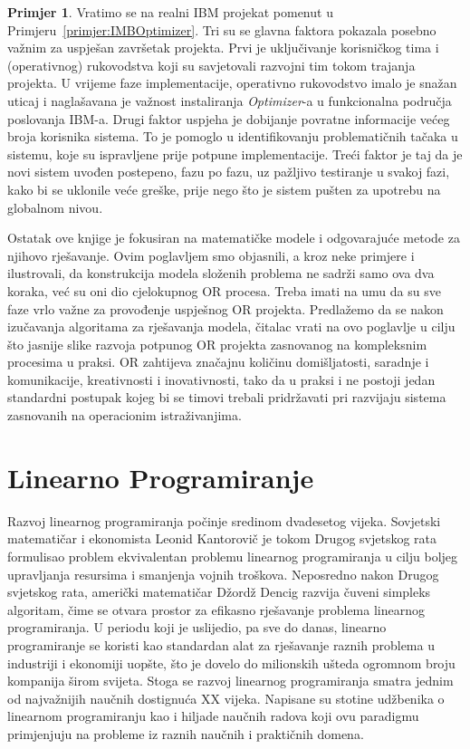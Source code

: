 \documentclass[a4paper, utf8, 11pt, colorlinks]{book}
\theoremstyle{definition}
\newtheorem{primjer}{Primjer}[chapter]
\begin{document}
\begin{primjer} Vratimo se na realni  IBM projekat pomenut u Primjeru~\ref{primjer:IMBOptimizer}.  Tri su se glavna faktora pokazala posebno važnim za uspješan završetak projekta. Prvi je   uključivanje korisničkog tima i (operativnog) rukovodstva koji su savjetovali razvojni tim tokom trajanja   projekta. U vrijeme faze implementacije, operativno rukovodstvo imalo je snažan  uticaj i naglašavana je važnost instaliranja \emph{Optimizer}-a u  funkcionalna područja poslovanja IBM-a. Drugi faktor uspjeha je dobijanje povratne informacije  većeg broja korisnika sistema. To je pomoglo u identifikovanju problematičnih tačaka u sistemu, koje su ispravljene prije potpune implementacije. 
Treći faktor je taj da je novi sistem  uvođen postepeno, fazu po fazu, uz pažljivo testiranje u svakoj fazi, kako bi se uklonile veće greške, prije nego što  je sistem   pušten za upotrebu na  globalnom nivou.  
\end{primjer}
\vspace{0.5cm}

Ostatak ove knjige je fokusiran na  matematičke modele i odgovarajuće metode za njihovo rješavanje. Ovim poglavljem smo objasnili, a kroz neke primjere i ilustrovali, da konstrukcija modela složenih problema ne sadrži samo ova dva koraka, već su oni  dio cjelokupnog OR procesa. Treba imati na umu da su sve faze vrlo važne za provođenje uspješnog OR projekta. Predlažemo da se nakon izučavanja algoritama za rješavanja modela, čitalac vrati na ovo poglavlje u cilju što jasnije slike razvoja potpunog OR projekta zasnovanog na kompleksnim procesima u praksi.  OR zahtijeva značajnu količinu domišljatosti, saradnje i komunikacije, kreativnosti i inovativnosti, tako da u praksi i ne postoji jedan standardni postupak kojeg bi se timovi trebali pridržavati pri razvijaju sistema zasnovanih na operacionim istraživanjima. %

\chapter{Linearno Programiranje} \label{chp:lp}
  
  Razvoj linearnog programiranja počinje sredinom dvadesetog vijeka. Sovjetski matematičar i ekonomista Leonid Kantorovič je tokom Drugog svjetskog rata formulisao problem ekvivalentan problemu linearnog programiranja u cilju boljeg upravljanja resursima i smanjenja vojnih troškova. Neposredno nakon Drugog svjetskog rata, američki matematičar Džordž Dencig razvija čuveni simpleks algoritam, čime se otvara prostor za efikasno rješavanje problema linearnog programiranja. U periodu koji je uslijedio, pa sve do danas, linearno programiranje se koristi kao standardan alat za rješavanje raznih problema u industriji i ekonomiji uopšte, što je dovelo do   milionskih ušteda ogromnom broju kompanija širom svijeta. Stoga se razvoj linearnog programiranja  smatra jednim od najvažnijih naučnih dostignu\-ća XX vijeka.  Napisane su stotine udžbenika o linearnom programiranju kao i hiljade naučnih radova koji ovu paradigmu primjenjuju na probleme iz raznih naučnih i praktičnih domena. 
\end{document}
